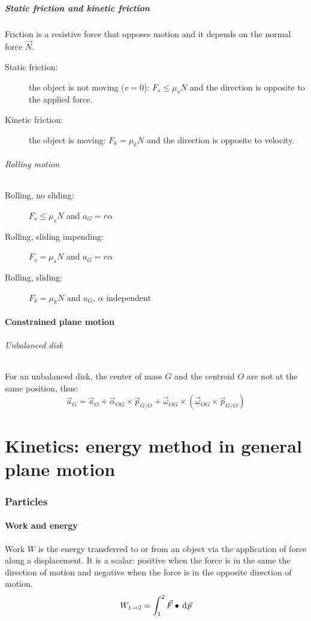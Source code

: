 \documentclass[10pt, twocolumn]{article}
\begin{document}
\subsubsection{Static friction and kinetic friction}
Friction is a resistive force that opposes motion and it depends on the normal force \(\vec{N}\).
\begin{description}
  \item[Static friction:] the object is not moving (\(v = 0\)): \(F_s \leqslant \mu_s N\) and the direction is opposite to the applied force.
  \item[Kinetic friction:] the object is moving:  \(F_k = \mu_k N\) and the direction is opposite to velocity.
\end{description}


\paragraph{Rolling motion}
\begin{description}
  \item[Rolling, no sliding:] \(F_s \leqslant \mu_s N\) and \(a_G = r\alpha\)
  \item[Rolling, sliding impending:] \(F_s = \mu_s N\) and \(a_G = r\alpha\)
  \item[Rolling, sliding:] \(F_k = \mu_k N\) and \(a_G\), \(\alpha\) independent
\end{description}


\subsection{Constrained plane motion}
\paragraph{Unbalanced disk}
For an unbalanced disk, the center of mass \(G\) and the centroid \(O\) are not at the same position, thus:
\[
  \vec{a}_G = \vec{a}_O + \vec{\alpha}_{OG} \times \vec{p}_{G/O} + \vec{\omega}_{OG} \times \left( \vec{\omega}_{OG} \times \vec{p}_{G/O} \right)
\]


\part{Kinetics: energy method in general plane motion}
\section{Particles}
\subsection{Work and energy}
Work \(W\) is the energy transferred to or from an object via the application of force along a displacement.
It is a scalar: positive when the force is in the same the direction of motion and negative when the force is in the opposite direction of motion.
\[
  W_{1 \to 2} = \int_1^2{\vec{F} \bullet \,\mathrm{d}^{} \vec{p}}
\]
\end{document}
